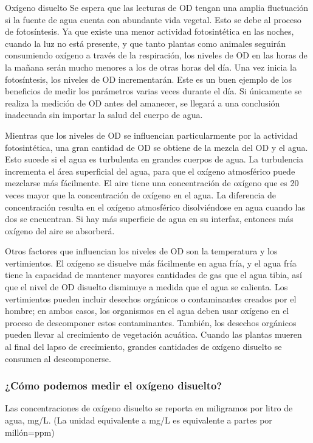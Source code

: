 Oxígeno disuelto
Se espera que las lecturas de OD tengan una amplia fluctuación si la fuente de agua cuenta con abundante vida vegetal. 
Esto se debe al proceso de fotosíntesis. 
Ya que existe una menor actividad fotosintética en las noches, cuando la luz no está presente, y que tanto plantas como animales seguirán consumiendo oxígeno a través de la respiración, los niveles de OD en las horas de la mañana serán mucho menores a los de otras horas del día. 
Una vez inicia la fotosíntesis, los niveles de OD incrementarán. 
Este es un buen ejemplo de los beneficios de medir los parámetros varias veces durante el día. 
Si únicamente se realiza la medición de OD antes del amanecer, se llegará a una conclusión inadecuada sin importar la salud del cuerpo de agua.

Mientras que los niveles de OD se influencian particularmente por la actividad fotosintética, una gran cantidad de OD se obtiene de la mezcla del OD y el agua. 
Esto sucede si el agua es turbulenta en grandes cuerpos de agua. 
La turbulencia incrementa el área superficial del agua, para que el oxígeno atmosférico puede mezclarse más fácilmente. 
El aire tiene una concentración de oxígeno que es 20 veces mayor que la concentración de ox\'igeno en el agua. 
La diferencia de concentración resulta en el oxígeno atmosférico disolviéndose en agua cuando las dos se encuentran. 
Si hay más superficie de agua en su interfaz, entonces más oxígeno del aire se absorberá.

Otros factores que influencian los niveles de OD son la temperatura y los vertimientos. 
El ox\'igeno se disuelve más f\'acilmente en agua fría, y el agua fría tiene la capacidad de mantener mayores cantidades de gas que el agua tibia, así que el nivel de OD disuelto disminuye a medida que el agua se calienta. 
Los vertimientos pueden incluir desechos orgánicos o contaminantes creados por el hombre; en ambos casos, los organismos en el agua deben usar oxígeno en el proceso de descomponer estos contaminantes.  
También, los desechos orgánicos pueden llevar al crecimiento de vegetación acuática.  
Cuando las plantas mueren al final del lapso de crecimiento, grandes cantidades de oxígeno disuelto se consumen al descomponerse.

\subsubsection{¿Cómo podemos medir el oxígeno disuelto?}
Las concentraciones de ox\'igeno disuelto se reporta en miligramos  por litro de agua, mg/L. (La unidad equivalente a mg/L es equivalente a partes por millón=ppm)  

